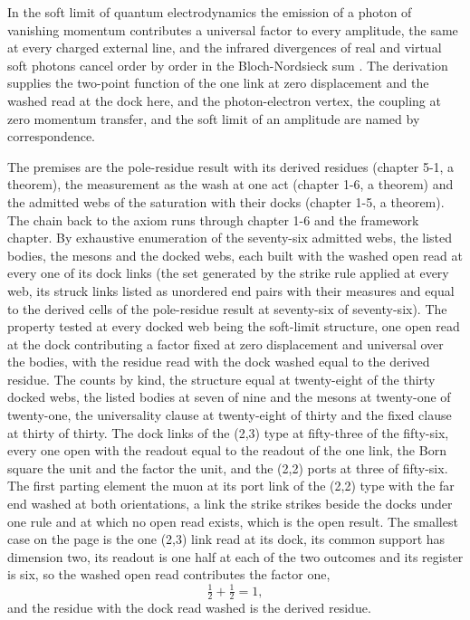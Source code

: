 \begin{chbridge}
In the soft limit of quantum electrodynamics the emission of a photon of vanishing momentum contributes a universal factor to every amplitude, the same at every charged external line, and the infrared divergences of real and virtual soft photons cancel order by order in the Bloch-Nordsieck sum \cite{Low1958,BlochNordsieck1937}. The derivation supplies the two-point function of the one link at zero displacement and the washed read at the dock here, and the photon-electron vertex, the coupling at zero momentum transfer, and the soft limit of an amplitude are named by correspondence.
\end{chbridge}
\begin{chproof}[census]
The premises are the pole-residue result with its derived residues (chapter 5-1, a theorem), the measurement as the wash at one act (chapter 1-6, a theorem) and the admitted webs of the saturation with their docks (chapter 1-5, a theorem). The chain back to the axiom runs through chapter 1-6 and the framework chapter. By exhaustive enumeration of the seventy-six admitted webs, the listed bodies, the mesons and the docked webs, each built with the washed open read at every one of its dock links (the set generated by the strike rule applied at every web, its struck links listed as unordered end pairs with their measures and equal to the derived cells of the pole-residue result at seventy-six of seventy-six). The property tested at every docked web being the soft-limit structure, one open read at the dock contributing a factor fixed at zero displacement and universal over the bodies, with the residue read with the dock washed equal to the derived residue. The counts by kind, the structure equal at twenty-eight of the thirty docked webs, the listed bodies at seven of nine and the mesons at twenty-one of twenty-one, the universality clause at twenty-eight of thirty and the fixed clause at thirty of thirty. The dock links of the (2,3) type at fifty-three of the fifty-six, every one open with the readout equal to the readout of the one link, the Born square the unit and the factor the unit, and the (2,2) ports at three of fifty-six. The first parting element the muon at its port link of the (2,2) type with the far end washed at both orientations, a link the strike strikes beside the docks under one rule and at which no open read exists, which is the open result. The smallest case on the page is the one (2,3) link read at its dock, its common support has dimension two, its readout is one half at each of the two outcomes and its register is six, so the washed open read contributes the factor one,
\begin{equation}
\tfrac12 + \tfrac12 = 1 ,
\end{equation}
and the residue with the dock read washed is the derived residue.


\end{chproof}
